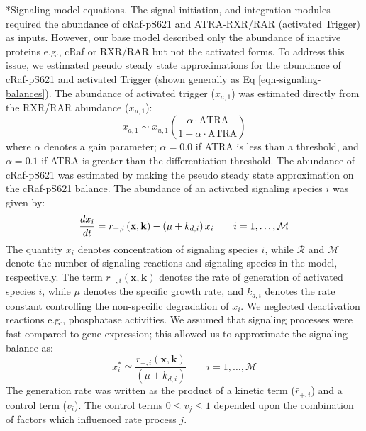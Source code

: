\documentclass[12pt]{article}
\makeatletter
\renewcommand\subsubsection{\@startsection
	{subsubsection}{2}{0mm}
	{-0.05in}
	{-0.5\baselineskip}
	{\normalfont\normalsize\itshape}}
\makeatother
\begin{document}
\subsubsection*{Signaling model equations.}
The signal initiation, and integration modules required the abundance of cRaf-pS621 and ATRA-RXR/RAR (activated Trigger) as inputs.
However, our base model described only the abundance of inactive proteins e.g., cRaf or RXR/RAR but not the activated forms.
To address this issue, we estimated pseudo steady state approximations for the abundance of cRaf-pS621 and activated Trigger (shown generally as Eq \eqref{eqn-signaling-balances}).
The abundance of activated trigger ($x_{a,1}$) was estimated directly from the RXR/RAR abundance ($x_{u,1}$):
\begin{equation}
	x_{a,1} \sim x_{u,1}\left(\frac{\alpha\cdot{\mathrm{ATRA}}}{1+\alpha\cdot\mathrm{ATRA}}\right)
\end{equation}
where $\alpha$ denotes a gain parameter; $\alpha = 0.0$ if ATRA is less than a threshold, and $\alpha = 0.1$ if ATRA is greater than the differentiation threshold.
The abundance of cRaf-pS621 was estimated by making the pseudo steady state approximation on the cRaf-pS621 balance.
The abundance of an activated signaling species $i$ was given by:
\begin{equation}
	\frac{dx_{i}}{dt}  =  r_{+,i}\left(\mathbf{x},\mathbf{k}\right) - \left(\mu+k_{d,i}\right)x_{i}\qquad{i=1,\hdots,\mathcal{M}}\\
\end{equation}
The quantity $x_{i}$ denotes concentration of signaling species $i$, while $\mathcal{R}$ and $\mathcal{M}$ denote the number of signaling reactions and signaling species in the model,
respectively. The term $r_{+,i}\left(\mathbf{x},\mathbf{k}\right)$ denotes the rate of generation of activated species $i$,
while $\mu$ denotes the specific growth rate, and $k_{d,i}$ denotes the rate constant controlling the non-specific degradation of $x_{i}$.
We neglected deactivation reactions e.g., phosphatase activities.
We assumed that signaling processes were fast compared to gene expression; this allowed us to approximate the signaling balance as:
\begin{equation}
	x_{i}^{*} \simeq \frac{r_{+,i}\left(\mathbf{x},\mathbf{k}\right)}{\left(\mu+k_{d,i}\right)} \qquad{i=1,\hdots,\mathcal{M}}
\end{equation}
The generation rate was written as the product of a kinetic term ($\bar{r}_{+,i}$) and a control term ($v_{i}$).
The control terms $0\leq v_{j}\leq 1$ depended upon the combination of factors which influenced rate process $j$.
\end{document}
